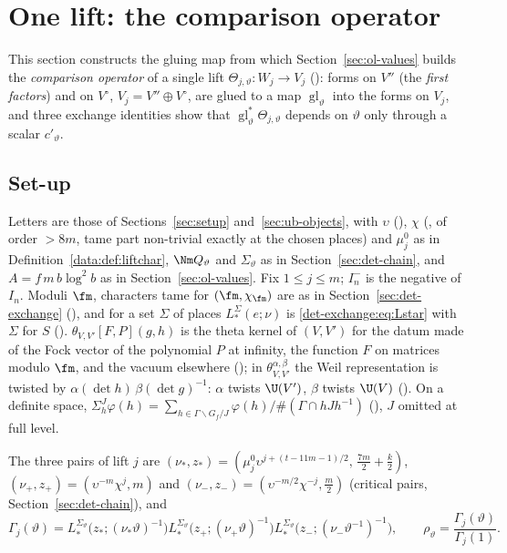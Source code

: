 \section{One lift: the comparison operator}\label{sec:ol-compare}

This section constructs the gluing map from which Section~\ref{sec:ol-values} builds the
\emph{comparison operator} of a single lift $\Theta_{j,\vartheta}\colon W_j\to V_j$
(): forms on $V''$ (the \emph{first factors}) and on
$V^\circ$, $V_j=V''\oplus V^\circ$, are glued to a map $\operatorname{gl}_\vartheta$ into the forms
on $V_j$, and three exchange identities show that $\operatorname{gl}_\vartheta^*\Theta_{j,\vartheta}$
depends on $\vartheta$ only through a scalar $c'_\vartheta$.

\subsection{Set-up}\label{ol-compare:sec:setup}

Letters are those of Sections~\ref{sec:setup} and~\ref{sec:ub-objects}, with $\upsilon$
(), $\chi$
(, of order $>8m$, tame part non-trivial exactly at the chosen places) and
$\mu_j^0$ as in Definition~\ref{data:def:liftchar}, $\Nm Q_\vartheta$ and $\Sigma_\vartheta$ as in
Section~\ref{sec:det-chain}, and $A=f\,m\,b\log^2b$ as in Section~\ref{sec:ol-values}. Fix
$1\le j\le m$; $I_n^-$ is the negative of $I_n$. Moduli $\fm$,
characters tame for $(\fm,\chi_\fm)$ are as in Section~\ref{sec:det-exchange}
(), and for a set $\Sigma$ of places $L_*^{\Sigma}(e;\nu)$ is
\eqref{det-exchange:eq:Lstar} with $\Sigma$ for $S$ ().
$\theta_{V,V'}[F,P](g,h)$ is the theta kernel of $(V,V')$ for the
datum made of the Fock vector of the polynomial $P$ at infinity, the function $F$ on matrices
modulo $\fm$, and the vacuum elsewhere (); in $\theta^{\alpha,\beta}_{V,V'}$ the Weil representation is
twisted by $\alpha(\det h)\,\beta(\det g)^{-1}$: $\alpha$ twists $\U(V')$, $\beta$ twists $\U(V)$ (). On a
definite space, $\Sigma^J_h\varphi(h)=\sum_{h\in\Gamma\backslash G_f/J}\varphi(h)/\#(\Gamma\cap hJh^{-1})$
(), $J$ omitted at full level.

\begin{definition}\label{ol-compare:def:gamma}
The three pairs of lift $j$ are $(\nu_*,z_*)=(\mu_j^0\upsilon^{j+(t-11m-1)/2},\,\tfrac{7m}2+\tfrac k2)$,
$(\nu_+,z_+)=(\upsilon^{-m}\chi^{j},m)$ and
$(\nu_-,z_-)=(\upsilon^{-m/2}\chi^{-j},\tfrac m2)$ (critical pairs, Section~\ref{sec:det-chain}), and
\[
  \Gamma_j(\vartheta)=L_*^{\Sigma_\vartheta}\bigl(z_*;(\nu_*\vartheta)^{-1}\bigr)
  L_*^{\Sigma_\vartheta}\bigl(z_+;(\nu_+\vartheta)^{-1}\bigr)
  L_*^{\Sigma_\vartheta}\bigl(z_-;(\nu_-\vartheta^{-1})^{-1}\bigr),\qquad
  \rho_\vartheta=\frac{\Gamma_j(\vartheta)}{\Gamma_j(1)}.
\]
\end{definition}

